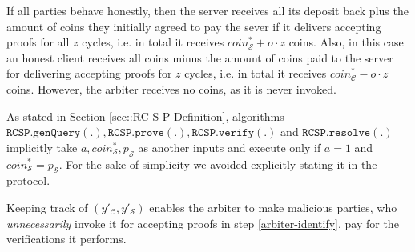 \begin{remark} If all parties behave honestly,   then the server receives all its deposit back plus the amount of coins they initially agreed to pay the sever if it  delivers accepting proofs for all $z$ cycles, i.e. in total it receives $coin^{\scriptscriptstyle *}_{\scriptscriptstyle\mathcal S}+o\cdot z$ coins. Also, in this case an honest client receives all coins minus the amount of coins paid to the server for delivering accepting proofs for $z$ cycles, i.e. in total it receives $coin^{\scriptscriptstyle *}_{\scriptscriptstyle\mathcal C}-o\cdot z$ coins. However, the arbiter receives no coins, as it is never invoked. 
\end{remark}

\begin{remark} As stated in Section \ref{sec::RC-S-P-Definition},   algorithms $\mathtt{RCSP}.\mathtt{genQuery}(.),\mathtt{RCSP}.\mathtt{prove}(.),\mathtt{RCSP}.\mathtt{verify}(.)$ and $\mathtt{RCSP}.\mathtt{resolve}(.)$ implicitly  take $a, coin^{\scriptscriptstyle*}_{\scriptscriptstyle\mathcal{S}}, p_{\scriptscriptstyle\mathcal{S}}$ as another inputs and  execute only if $a=1$ and $coin^{\scriptscriptstyle*}_{\scriptscriptstyle\mathcal{S}}=p_{\scriptscriptstyle\mathcal{S}}$. For the sake of simplicity we  avoided explicitly stating it in the protocol.   
\end{remark}

\begin{remark}
Keeping track of  $(y'_{\scriptscriptstyle\mathcal C},y'_{\scriptscriptstyle\mathcal S})$ enables the arbiter to make malicious parties, who \emph{unnecessarily} invoke  it for  accepting proofs in step \ref{arbiter-identify}, pay  for the verifications it performs. 
\end{remark}








